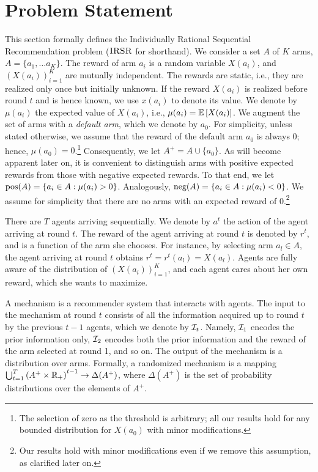 \section{Problem Statement}\label{sec:problem statement}
This section formally defines the Individually Rational Sequential Recommendation problem ($\textsc{IRSR}$ for shorthand). We consider a set $A$ of $K$ arms, $A=\{a_1,\dots a_K\}$. The reward of arm $a_i$ is a random variable $X(a_i)$, and $(X(a_i))_{i=1}^K$ are mutually independent. The rewards are static, i.e., they are realized only once but initially unknown. If the reward $X(a_i)$ is realized before round $t$ and is hence known, we use $x(a_i)$ to denote its value. We denote by $\mu({a_i})$ the expected value of $X(a_i)$, i.e., $\mu(a_i)=\operatorname{\mathbb{E}}\left[X(a_i)\right]$. We augment the set of arms with a \textit{default arm}, which we denote by $a_0$. For simplicity, unless stated otherwise, we assume that the reward of the default arm $a_0$ is always 0; hence, $\mu(a_0)=0$.\footnote{The selection of zero as the threshold is arbitrary; all our results hold for any bounded distribution for $X(a_0)$ with minor modifications.} Consequently, we let $A^+ = A\cup\{a_0\}$. As will become apparent later on, it is convenient to distinguish arms with positive expected rewards from those with negative expected rewards. To that end, we let 
$\textnormal{pos}(A)=\{a_i\in A:\mu(a_i) > 0 \}$. Analogously, $\textnormal{neg}(A)=\{a_i\in A:\mu(a_i)< 0 \}$. We assume for simplicity that there are no arms with an expected reward of 0.\footnote{Our results hold with minor modifications even if we remove this assumption, as clarified later on.} %

There are $T$ agents arriving sequentially. We denote by $a^t$ the action of the agent arriving at round $t$. The reward of the agent arriving at round $t$ is denoted by $r^t$, and is a function of the arm she chooses. For instance, by selecting arm $a_l \in A$, the agent arriving at round $t$ obtains $r^t = r^t(a_l)=X(a_l)$. 
Agents are fully aware of the distribution of $(X(a_i))_{i=1}^K$, and each agent cares about her own reward, which she wants to maximize. 

A mechanism is a recommender system that interacts with agents. The input to the mechanism at round $t$ consists of all the information acquired up to round $t$ by the previous $t-1$ agents, which we denote by $\mathcal{I}_t$. Namely, $\mathcal{I}_1$ encodes the prior information only, $\mathcal{I}_2$ encodes both the prior information and the reward of the arm selected at round 1, and so on. The output of the mechanism is a distribution over arms. Formally, a randomized mechanism is a mapping $ \bigcup_{t=1}^T \left(A^+\times \mathbb{R}_+ \right)^{t-1} \rightarrow \Delta(A^+)$, where $\Delta(A^+)$ is the set of probability distributions over the elements of $A^+$. 

